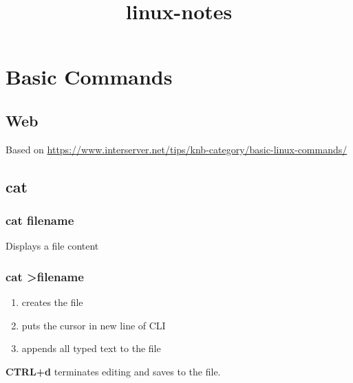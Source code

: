 \documentclass{report}
\title{linux-notes}
\begin{document}
	
	


\part{Basic Commands}



\chapter{Web}
Based on \url{https://www.interserver.net/tips/knb-category/basic-linux-commands/}



\chapter{cat}


\section{cat filename}
Displays a file content


\section{cat \textgreater filename}
\begin{enumerate}
	\item creates the file
	\item puts the cursor in new line of CLI
	\item appends all typed text to the file
\end{enumerate}
\textbf{CTRL+d} terminates editing and saves to the file.
	
	
	
\end{document}
